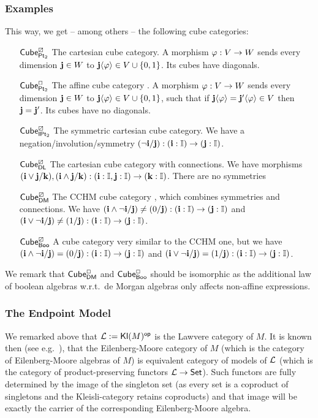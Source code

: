\documentclass[a4paper]{memoir}
\begin{document}
\subsubsection{Examples}
This way, we get -- among others -- the following cube categories:
\begin{enumerate}
	\item[${\mathsf{Cube}}^\boxslash_{{\mathsf{Pt}_2}}$] The cartesian cube category.
	A morphism $\varphi : V \to W$ sends every dimension $\mathbf{j} \in W$ to $\mathbf{j} \langle \varphi \rangle \in V \cup \mathopen{}\left\{ 0, 1 \right\}\mathclose{}$.
	Its cubes have diagonals.
	\item[${\mathsf{Cube}}^\Box_{{\mathsf{Pt}_2}}$] The affine cube category \cite{bch}.
	A morphism $\varphi : V \to W$ sends every dimension $\mathbf{j} \in W$ to $\mathbf{j} \langle \varphi \rangle \in V \cup \mathopen{}\left\{ 0, 1 \right\}\mathclose{}$, such that if $\mathbf{j}\langle \varphi \rangle = \mathbf{j}' \langle \varphi \rangle \in V$ then $\mathbf{j} = \mathbf{j}'$.
	Its cubes have no diagonals.
	\item[${\mathsf{Cube}}^\boxslash_{{\mathsf{IPt}_2}}$] The symmetric cartesian cube category. We have a negation/involution/symmetry $(\lnot \mathbf{i} / \mathbf{j}) : (\mathbf{i} : {\mathbb I}) \to (\mathbf{j} : {\mathbb I})$.
	\item[${\mathsf{Cube}}^\boxslash_{\mathsf{DL}}$] The cartesian cube category with connections. We have morphisms $(\mathbf{i} \vee \mathbf{j} / \mathbf{k}), (\mathbf{i} \wedge \mathbf{j} / \mathbf{k}) : (\mathbf{i} : {\mathbb I}, \mathbf{j} : {\mathbb I}) \to (\mathbf{k} : {\mathbb I})$. There are no symmetries
	\item[${\mathsf{Cube}}^\boxslash_{\mathsf{DM}}$] The CCHM cube category \cite{cubical}, which combines symmetries and connections. We have $(\mathbf{i} \wedge \lnot \mathbf{i} / \mathbf{j}) \neq (0/\mathbf{j}) : (\mathbf{i} : {\mathbb I}) \to (\mathbf{j} : {\mathbb I})$ and $(\mathbf{i} \vee \lnot \mathbf{i} / \mathbf{j}) \neq (1/\mathbf{j}) : (\mathbf{i} : {\mathbb I}) \to (\mathbf{j} : {\mathbb I})$.
	\item[${\mathsf{Cube}}^\boxslash_{\mathsf{Boo}}$] A cube category very similar to the CCHM one, but we have $(\mathbf{i} \wedge \lnot \mathbf{i} / \mathbf{j}) = (0/\mathbf{j}) : (\mathbf{i} : {\mathbb I}) \to (\mathbf{j} : {\mathbb I})$ and $(\mathbf{i} \vee \lnot \mathbf{i} / \mathbf{j}) = (1/\mathbf{j}) : (\mathbf{i} : {\mathbb I}) \to (\mathbf{j} : {\mathbb I})$.
\end{enumerate}
We remark that ${\mathsf{Cube}}^\Box_{\mathsf{DM}}$ and ${\mathsf{Cube}}^\Box_{\mathsf{Boo}}$ should be isomorphic as the additional law of boolean algebras w.r.t.\ de Morgan algebras only affects non-affine expressions.

\subsubsection{The Endpoint Model}
We remarked above that ${\mathcal L} := {\mathsf{Kl}}(M)^{\mathsf{op}}$ is the Lawvere category of $M$.
It is known then (see e.g.\ \cite{keml-diagrams}), that the Eilenberg-Moore category of $M$ (which is the category of Eilenberg-Moore algebras of $M$) is equivalent category of models of ${\mathcal L}$ (which is the category of product-preserving functors ${\mathcal L} \to {\mathsf{Set}}$).
Such functors are fully determined by the image of the singleton set (as every set is a coproduct of singletons and the Kleisli-category retains coproducts) and that image will be exactly the carrier of the corresponding Eilenberg-Moore algebra.
\end{document}
